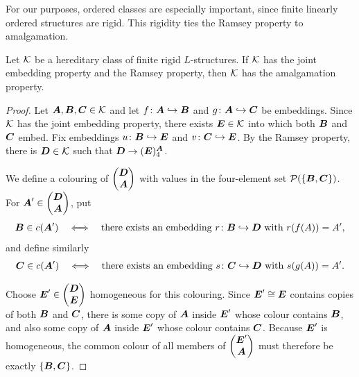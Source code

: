 For our purposes, ordered classes are especially important, since finite linearly ordered structures are rigid. This rigidity ties the Ramsey property to amalgamation.

\begin{proposition}
    \label{prop:rigid-rp-implies-ap}
    Let \(\mathcal{K}\) be a hereditary class of finite rigid \(L\)-structures. If \(\mathcal{K}\) has the joint embedding property and the Ramsey property, then \(\mathcal{K}\) has the amalgamation property.
\end{proposition}

\begin{proof}
    Let \(\boldsymbol{A},\boldsymbol{B},\boldsymbol{C} \in \mathcal{K}\) and let \(f \colon \boldsymbol{A} \hookrightarrow \boldsymbol{B}\) and \(g \colon \boldsymbol{A} \hookrightarrow \boldsymbol{C}\) be embeddings. Since \(\mathcal{K}\) has the joint embedding property, there exists \(\boldsymbol{E} \in \mathcal{K}\) into which both \(\boldsymbol{B}\) and \(\boldsymbol{C}\) embed. Fix embeddings \(u \colon \boldsymbol{B} \hookrightarrow \boldsymbol{E}\) and \(v \colon \boldsymbol{C} \hookrightarrow \boldsymbol{E}\). By the Ramsey property, there is \(\boldsymbol{D} \in \mathcal{K}\) such that \(\boldsymbol{D} \to (\boldsymbol{E})^{\boldsymbol{A}}_4\).

    We define a colouring of \(\begin{pmatrix} \boldsymbol{D} \\ \boldsymbol{A} \end{pmatrix}\) with values in the four-element set \(\mathcal{P}(\{\boldsymbol{B},\boldsymbol{C}\})\). For \(\boldsymbol{A}' \in \begin{pmatrix} \boldsymbol{D} \\ \boldsymbol{A} \end{pmatrix}\), put
    \[
        \boldsymbol{B} \in c(\boldsymbol{A}')
        \quad\Longleftrightarrow\quad
        \text{there exists an embedding } r \colon \boldsymbol{B} \hookrightarrow \boldsymbol{D} \text{ with } r(f(A))=A',
    \]
    and define similarly
    \[
        \boldsymbol{C} \in c(\boldsymbol{A}')
        \quad\Longleftrightarrow\quad
        \text{there exists an embedding } s \colon \boldsymbol{C} \hookrightarrow \boldsymbol{D} \text{ with } s(g(A))=A'.
    \]

    Choose \(\boldsymbol{E}' \in \begin{pmatrix} \boldsymbol{D} \\ \boldsymbol{E} \end{pmatrix}\) homogeneous for this colouring. Since \(\boldsymbol{E}' \cong \boldsymbol{E}\) contains copies of both \(\boldsymbol{B}\) and \(\boldsymbol{C}\), there is some copy of \(\boldsymbol{A}\) inside \(\boldsymbol{E}'\) whose colour contains \(\boldsymbol{B}\), and also some copy of \(\boldsymbol{A}\) inside \(\boldsymbol{E}'\) whose colour contains \(\boldsymbol{C}\). Because \(\boldsymbol{E}'\) is homogeneous, the common colour of all members of \(\begin{pmatrix} \boldsymbol{E}' \\ \boldsymbol{A} \end{pmatrix}\) must therefore be exactly \(\{\boldsymbol{B},\boldsymbol{C}\}\).


\end{proof}
